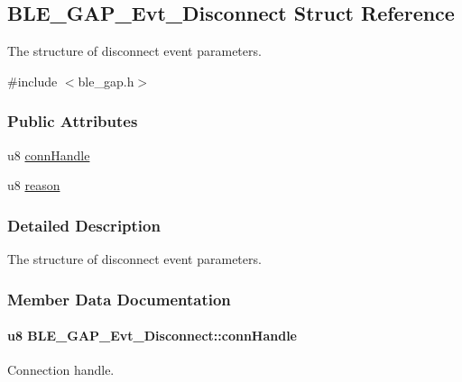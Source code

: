 \hypertarget{struct_b_l_e___g_a_p___evt___disconnect}{}\subsection{B\+L\+E\+\_\+\+G\+A\+P\+\_\+\+Evt\+\_\+\+Disconnect Struct Reference}
\label{struct_b_l_e___g_a_p___evt___disconnect}


The structure of disconnect event parameters.  




{\ttfamily \#include $<$ble\+\_\+gap.\+h$>$}

\subsubsection*{Public Attributes}
\begin{DoxyCompactItemize}
\item 
u8 \hyperlink{struct_b_l_e___g_a_p___evt___disconnect_a07d76226f3cc07a8bf79eca9bd07e054}{conn\+Handle}
\item 
u8 \hyperlink{struct_b_l_e___g_a_p___evt___disconnect_ad91e51c7ffd5650eab9886f1d8d96348}{reason}
\end{DoxyCompactItemize}


\subsubsection{Detailed Description}
The structure of disconnect event parameters. 

\subsubsection{Member Data Documentation}
\paragraph[{\texorpdfstring{conn\+Handle}{connHandle}}]{\setlength{\rightskip}{0pt plus 5cm}u8 B\+L\+E\+\_\+\+G\+A\+P\+\_\+\+Evt\+\_\+\+Disconnect\+::conn\+Handle}\hypertarget{struct_b_l_e___g_a_p___evt___disconnect_a07d76226f3cc07a8bf79eca9bd07e054}{}\label{struct_b_l_e___g_a_p___evt___disconnect_a07d76226f3cc07a8bf79eca9bd07e054}
Connection handle. 
